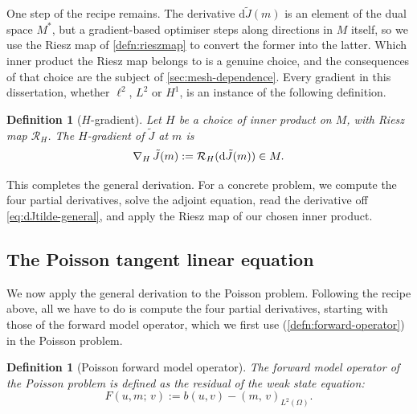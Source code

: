 \documentclass[a4paper,11pt]{article}
\newcommand{\Om}{\Omega}
\newcommand{\Lp}[1]{L^{2}(#1)}              %
\newcommand{\inner}[3]{(#1,\,#2)_{#3}}        %
\newcommand{\Rmap}{\mathcal{R}}              %
\newcommand{\Jt}{\tilde{J}}                  %
\newcommand{\Mspace}{M}
\theoremstyle{spacedplain} \newtheorem{theorem}[counter]{Theorem} \newtheorem{lemma}[counter]{Lemma} \newtheorem{prop}[counter]{Proposition} \newtheorem{cor}[counter]{Corollary}
\theoremstyle{spaceddefinition} \newtheorem{defn}[counter]{Definition} \newtheorem{example}[counter]{Example} \newtheorem{remark}[counter]{Remark}
\begin{document}
One step of the recipe remains. The derivative $\mathrm{d}\Jt(m)$ is an element of the dual space $\Mspace^{*}$, but a gradient-based optimiser steps along directions in $\Mspace$ itself, so we use the Riesz map of \cref{defn:rieszmap} to convert the former into the latter. Which inner product the Riesz map belongs to is a genuine choice, and the consequences of that choice are the subject of \cref{sec:mesh-dependence}. Every gradient in this dissertation, whether $\ell^{2}$, $L^{2}$ or $H^{1}$, is an instance of the following definition.

\begin{defn}[$H$-gradient]
\label{defn:Hgradient}
Let $H$ be a choice of inner product on $\Mspace$, with Riesz map $\Rmap_H$. The \emph{$H$-gradient} of $\Jt$ at $m$ is
\begin{equation}
  \label{eq:Hgradient}
  \grad_{H} \Jt(m) := \Rmap_H(\mathrm{d}\Jt(m)) \in \Mspace.
\end{equation}
\end{defn}

This completes the general derivation. For a concrete problem, we compute the four partial derivatives, solve the adjoint equation, read the derivative off \cref{eq:dJtilde-general}, and apply the Riesz map of our chosen inner product.

\subsection{The Poisson tangent linear equation}
\label{sec:deriv:tangent}

We now apply the general derivation to the Poisson problem. Following the recipe above, all we have to do is compute the four partial derivatives, starting with those of the forward model operator, which we first use (\cref{defn:forward-operator}) in the Poisson problem.

\begin{defn}[Poisson forward model operator]
\label{defn:poisson-forward-operator} The \emph{forward model operator} of the Poisson problem is defined as the residual of the weak state equation:
\begin{equation}
  F(u, m;\, v) := b(u, v) - \inner{m}{v}{\Lp{\Om}}.
\end{equation}
\end{defn}
\end{document}
